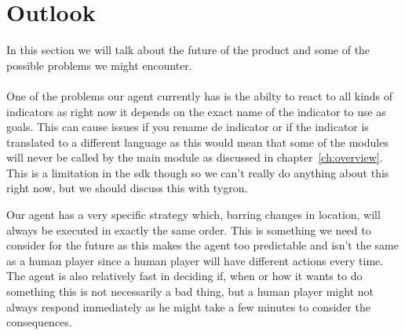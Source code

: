 \chapter{Outlook}
In this section we will talk about the future of the product and some of the possible problems we might encounter.
\\
\\
One of the problems our agent currently has is the abilty to react to all kinds of indicators as right now it depends on the exact name of the indicator to use as goals. 
This can cause issues if you rename de indicator or if the indicator is translated to a different language as this would mean that some of the modules will never be called by the main module as discussed in chapter~\ref{ch:overview}. 
This is a limitation in the sdk though so we can't really do anything about this right now, but we should discuss this with tygron.

Our agent has a very specific strategy which, barring changes in location, will always be executed in exactly the same order.
This is something we need to consider for the future as this makes the agent too predictable and isn't the same as a human player since a human player will have different actions every time.
The agent is also relatively fast in deciding if, when or how it wants to do something this is not necessarily a bad thing, but a human player might not always respond immediately as he might take a few minutes to consider the consequences. 

